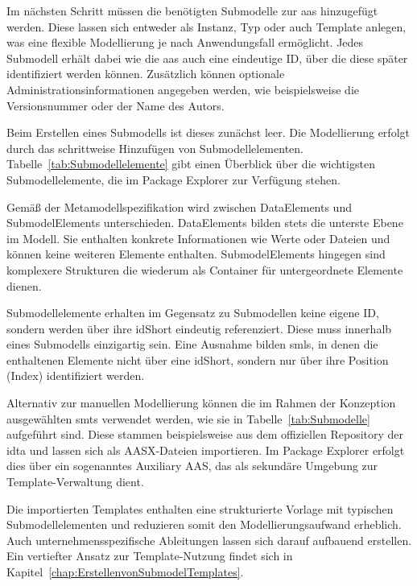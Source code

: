 Im nächsten Schritt müssen die benötigten Submodelle zur \acs{aas} hinzugefügt werden.
Diese lassen sich entweder als Instanz, Typ oder auch Template anlegen, was eine flexible Modellierung je nach Anwendungsfall ermöglicht.
Jedes Submodell erhält dabei wie die \acs{aas} auch eine eindeutige ID, über die diese später identifiziert werden können.
Zusätzlich können optionale Administrationsinformationen angegeben werden, wie beispielsweise die Versionsnummer oder der Name des Autors.

Beim Erstellen eines Submodells ist dieses zunächst leer. 
Die Modellierung erfolgt durch das schrittweise Hinzufügen von Submodellelementen.
Tabelle~\ref{tab:Submodellelemente} gibt einen Überblick über die wichtigsten Submodellelemente, die im Package Explorer zur Verfügung stehen.


\vspace{-0.5em}

Gemäß der Metamodellspezifikation \cite{SpezifikationPart1} wird zwischen DataElements und SubmodelElements unterschieden.
DataElements bilden stets die unterste Ebene im Modell. Sie enthalten konkrete Informationen wie Werte oder Dateien und können keine weiteren Elemente enthalten.
SubmodelElements hingegen sind komplexere Strukturen die wiederum als Container für untergeordnete Elemente dienen.

Submodellelemente erhalten im Gegensatz zu Submodellen keine eigene ID, sondern werden über ihre idShort eindeutig referenziert.
Diese muss innerhalb eines Submodells einzigartig sein.
Eine Ausnahme bilden \acsp{sml}, in denen die enthaltenen Elemente nicht über eine idShort, sondern nur über ihre Position (Index) identifiziert werden.

Alternativ zur manuellen Modellierung können die im Rahmen der Konzeption ausgewählten \acsp{smt} verwendet werden, wie sie in Tabelle~\ref{tab:Submodelle} aufgeführt sind.
Diese stammen beispielsweise aus dem offiziellen Repository der \acs{idta} \cite{idtaTemplates} und lassen sich als AASX-Dateien importieren.
Im Package Explorer erfolgt dies über ein sogenanntes Auxiliary AAS, das als sekundäre Umgebung zur Template-Verwaltung dient.

Die importierten Templates enthalten eine strukturierte Vorlage mit typischen Submodellelementen und reduzieren somit den Modellierungsaufwand erheblich.
Auch unternehmensspezifische Ableitungen lassen sich darauf aufbauend erstellen.
Ein vertiefter Ansatz zur Template-Nutzung findet sich in Kapitel~\ref{chap:ErstellenvonSubmodelTemplates}.

